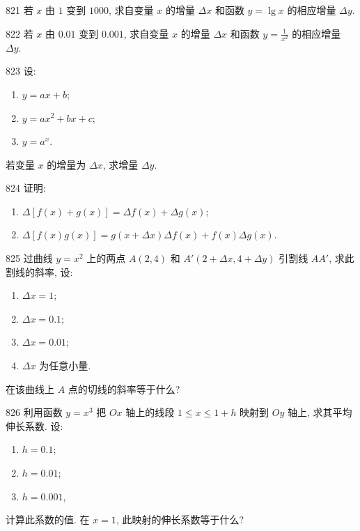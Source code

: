 

\begin{prob}[S]{821}
若 $x$ 由 $1$ 变到 $1000$, 求自变量 $x$ 的增量 $\Delta x$ 和函数 $y = \lg x$ 的相应增量 $\Delta y$.
\end{prob}

\begin{prob}[S]{822}
若 $x$ 由 $0.01$ 变到 $0.001$, 求自变量 $x$ 的增量 $\Delta x$ 和函数 $y = \frac{1}{x^2}$ 的相应增量 $\Delta y$.
\end{prob}

\begin{prob}[L]{823}
设:
\begin{enumerate}[label=(\alph*), itemsep=2pt, topsep=3pt]
\item $y = ax + b$;
\item $y = ax^2 + bx + c$;
\item $y = a^x$.
\end{enumerate}
若变量 $x$ 的增量为 $\Delta x$, 求增量 $\Delta y$.
\end{prob}

\begin{prob}[M]{824}
证明:
\begin{enumerate}[label=(\alph*), itemsep=2pt, topsep=3pt]
\item $\Delta[f(x) + g(x)] = \Delta f(x) + \Delta g(x)$;
\item $\Delta[f(x)g(x)] = g(x + \Delta x)\Delta f(x) + f(x)\Delta g(x)$.
\end{enumerate}
\end{prob}

\begin{prob}[L]{825}
过曲线 $y = x^2$ 上的两点 $A(2, 4)$ 和 $A'(2 + \Delta x, 4 + \Delta y)$ 引割线 $AA'$, 求此割线的斜率, 设:
\begin{enumerate}[label=(\alph*), itemsep=2pt, topsep=3pt]
\item $\Delta x = 1$;
\item $\Delta x = 0.1$;
\item $\Delta x = 0.01$;
\item $\Delta x$ 为任意小量.
\end{enumerate}
在该曲线上 $A$ 点的切线的斜率等于什么?
\end{prob}

\begin{prob}[L]{826}
利用函数 $y = x^3$ 把 $Ox$ 轴上的线段 $1 \leqslant x \leqslant 1 + h$ 映射到 $Oy$ 轴上, 求其平均伸长系数. 设:
\begin{enumerate}[label=(\alph*), itemsep=2pt, topsep=3pt]
\item $h = 0.1$;
\item $h = 0.01$;
\item $h = 0.001$,
\end{enumerate}
计算此系数的值. 在 $x = 1$, 此映射的伸长系数等于什么?
\end{prob}

